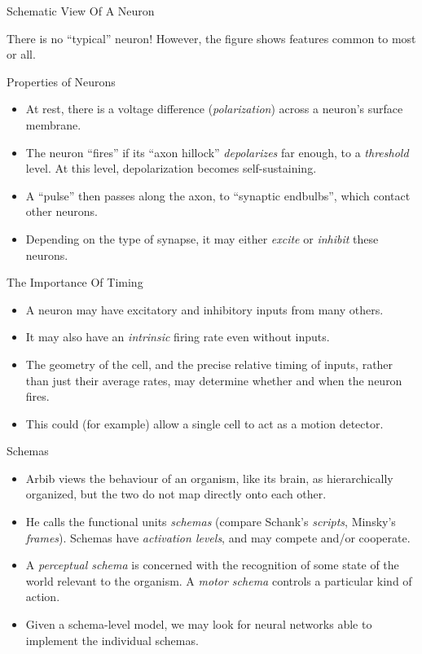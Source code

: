 \documentclass{article}
\begin{document}
\begin{slide}{}
{\Large Schematic View Of A Neuron}

There is no ``typical'' neuron! However, the figure shows features common to
most or all.
\begin{center}


\end{center}
\end{slide}

\begin{slide}{}
{\Large Properties of Neurons}
\begin{itemize}
\item At rest, there is a voltage difference ({\em polarization})
across a neuron's surface membrane. 
\item The neuron ``fires'' if its ``axon hillock''
{\em depolarizes} far enough, to a {\em threshold} level. At this
level, depolarization becomes self-sustaining. 
\item A ``pulse'' then passes along the axon, to ``synaptic
endbulbs'', which  contact other neurons.
\item Depending on the type of synapse, it may either {\em excite} or
{\em inhibit} these neurons.
\end{itemize}
\end{slide}

\begin{slide}{}
{\Large The Importance Of Timing}
\begin{itemize}
\item A neuron may have excitatory and inhibitory inputs from many others.
\item It may also have an {\em intrinsic} firing rate even without
inputs.
\item The geometry of the cell, and the precise relative timing of inputs,
rather than just their average rates, may determine whether and when
the neuron fires.
\item This could (for example) allow a single cell to act as a motion detector.
\end{itemize}
\end{slide}

\begin{slide}{}
{\Large Schemas}
\begin{itemize}
\item Arbib views the behaviour of an organism, like its brain, as
hierarchically organized, but the two do not map directly
onto each other.
\item He calls the functional units {\em schemas} (compare Schank's
{\em scripts}, Minsky's {\em frames}). Schemas have {\em
activation levels}, and may compete and/or cooperate.
\item A {\em perceptual schema} is concerned with the recognition of
some state of the world relevant to the organism. A {\em motor schema}
controls a particular kind of action.
\item Given a schema-level model, we may look for neural
networks able to implement the individual schemas.
\end{itemize}
\end{slide}
\end{document}
